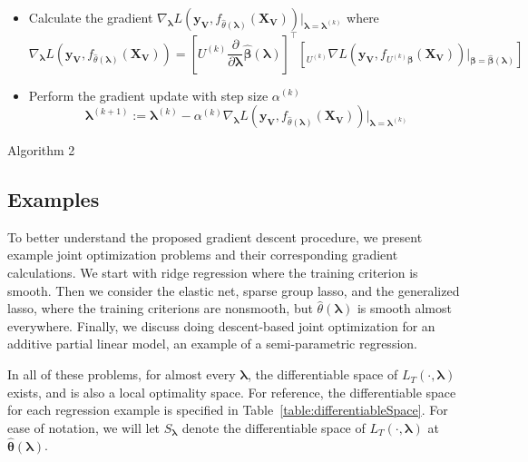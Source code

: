 \documentclass[10pt,letterpaper]{article}
\begin{document}
\begin{center}
{{\begin{itemize}
              \item[] Calculate the gradient $\nabla_{\boldsymbol{\lambda}} L(\boldsymbol{y_V}, f_{\hat \theta(\boldsymbol{\lambda})}(\boldsymbol{X_V})) |_{\boldsymbol{\lambda} = \boldsymbol{\lambda}^{(k)}}$ where
              	\begin{equation}
              	\nabla_{\boldsymbol{\lambda}} L(\boldsymbol{y_V}, f_{\hat \theta(\boldsymbol{\lambda})}(\boldsymbol{X_V})) =
		\left [
	  	U^{(k)}
		\frac{\partial}{\partial \boldsymbol \lambda} \hat{\boldsymbol \beta}(\boldsymbol{\lambda})
		\right ]^\top
		\left [
		_{U^{(k)}}\nabla L(\boldsymbol{y_V}, f_{U^{(k)}\boldsymbol \beta}(\boldsymbol{X_V}))
               	\big |_{\boldsymbol \beta = \hat{\boldsymbol \beta}(\boldsymbol \lambda)}
		\right ]
	     	\label{gradientCalculation}
              	\end{equation}
              
              \item[] Perform the gradient update with step size $\alpha^{(k)}$
	\begin{equation*}
	\boldsymbol{\lambda}^{(k+1)} := \boldsymbol{\lambda}^{(k)} - \alpha^{(k)} \nabla_{\boldsymbol{\lambda}} L(\boldsymbol{y_V}, f_{\hat \theta(\boldsymbol{\lambda})}(\boldsymbol{X_V})) |_{\boldsymbol{\lambda} = \boldsymbol{\lambda}^{(k)}}
	\end{equation*}
         \end{itemize}
    }
  }
  Algorithm 2
\end{center}

\subsection{Examples}

To better understand the proposed gradient descent procedure, we present example joint optimization problems and their corresponding gradient calculations. We start with ridge regression where the training criterion is smooth. Then we consider the elastic net, sparse group lasso, and the generalized lasso, where the training criterions are nonsmooth, but $\hat{\theta}(\boldsymbol\lambda)$ is smooth almost everywhere. Finally, we discuss doing descent-based joint optimization for an additive partial linear model, an example of a semi-parametric regression.

In all of these problems, for almost every $\boldsymbol{\lambda}$, the differentiable space of $L_T(\cdot, \boldsymbol{\lambda})$ exists, and is also a local optimality space. For reference, the differentiable space for each regression example is specified in Table~\ref{table:differentiableSpace}. For ease of notation, we will let $S_{\boldsymbol{\lambda}}$ denote the differentiable space of $L_T(\cdot, \boldsymbol{\lambda})$ at $\hat{\boldsymbol{\theta}}(\boldsymbol{\lambda})$.
\end{document}
